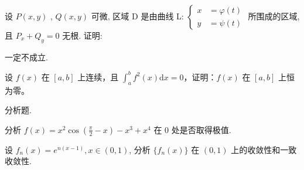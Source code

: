 \par{}
设  $P(x,y)$ ,  $Q(x,y)$  可微, 区域 D 是由曲线 L:  $\left\{\begin{aligned} x &= \varphi(t) \\ y &= \psi(t) \end{aligned}\right.$  所围成的区域, 且  $P_{x} + Q_{y} = 0$  无根.
证明:\par
\nopagebreak[4]
一定不成立.\par
设 $f(x)$ 在 $[a, b]$ 上连续，且 $\int_{a}^{b} f^{2}(x) \mathrm{d}x = 0$，证明：$f(x)$ 在 $[a, b]$ 上恒为零。\par
\par{}
分析题.\par
分析 $f(x) = x^{2} \cos \left( \frac{\pi}{2} - x \right) - x^{3} + x^{4}$ 在 0 处是否取得极值.\par
设 $f_{n}(x) = e^{n(x - 1)}, x \in (0,1)$, 分析 $\{f_{n}(x)\}$ 在 $(0,1)$ 上的收敛性和一致收敛性.\par
